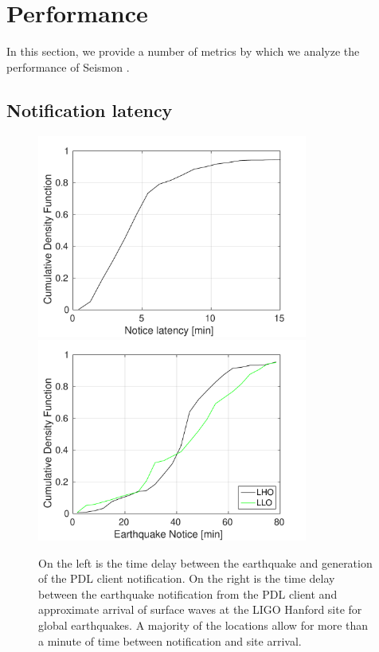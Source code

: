 \documentclass[reprint, prl, aps, showpacs]{revtex4-1}
\newcommand{\seismon}{\textnormal{Seismon }}
\begin{document}
\section{Performance}
\label{sec:performance}

In this section, we provide a number of metrics by which we analyze the performance of \seismon.

\subsection{Notification latency}

\begin{figure}[t]
\hspace*{-0.5cm}
 \includegraphics[width=3.5in]{earthquake_notice.pdf}
 \includegraphics[width=3.5in]{lockloss_notice.pdf}
 \caption{On the left is the time delay between the earthquake and generation of the PDL client notification. On the right is the time delay between the earthquake notification from the PDL client and approximate arrival of surface waves at the LIGO Hanford site for global earthquakes. A majority of the locations allow for more than a minute of time between notification and site arrival.}
 \label{fig:delays}
\end{figure}
\end{document}
